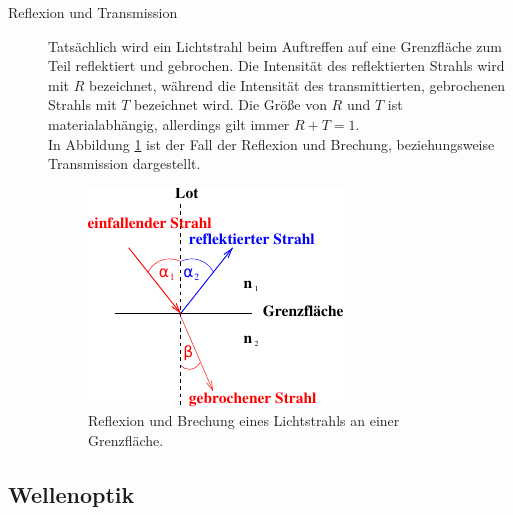 \begin{description}
    \item[Reflexion und Transmission]  
    Tatsächlich wird ein Lichtstrahl beim Auftreffen auf eine Grenzfläche zum Teil reflektiert und gebrochen.
    Die Intensität des reflektierten Strahls wird mit $R$ bezeichnet,
    während die Intensität des transmittierten,
    gebrochenen Strahls mit $T$ bezeichnet wird.
    Die Größe von $R$ und $T$ ist materialabhängig,
    allerdings gilt immer $R + T = 1$.\\
    In Abbildung \ref{fig:transmission} ist der Fall der Reflexion und Brechung, beziehungsweise Transmission dargestellt.
    \begin{figure}[H]
        \centering
        \includegraphics[scale=1]{content/img/Abb_2c.pdf}
        \caption{Reflexion und Brechung eines Lichtstrahls an einer Grenzfläche.}
        \label{fig:transmission}
    \end{figure}
\end{description}

    

\subsection{Wellenoptik}

